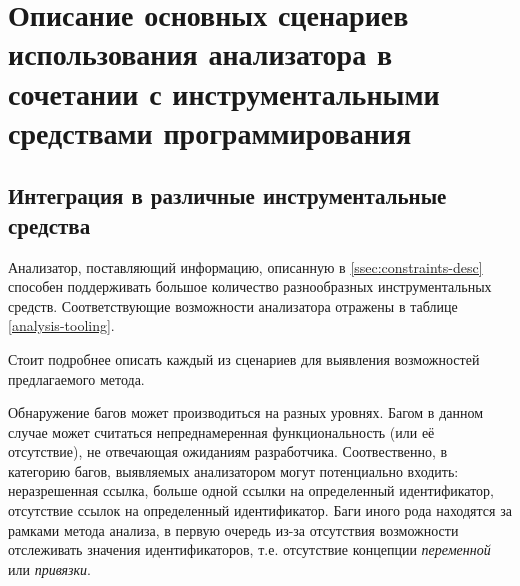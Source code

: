 \chapter{Описание основных сценариев использования анализатора в сочетании с
инструментальными средствами программирования}

\section{Интеграция в различные инструментальные средства}

Анализатор, поставляющий информацию, описанную в \ref{ssec:constraints-desc} способен
поддерживать большое количество разнообразных инструментальных средств. Соответствующие
возможности анализатора отражены в таблице \ref{analysis-tooling}.

\begin{table}[h]
    \caption{\textbf{Поддержка анализатором различных сценариев использования инструментальных средств}}
    \label{analysis-tooling}
\end{table}

Стоит подробнее описать каждый из сценариев для выявления возможностей предлагаемого метода.

Обнаружение багов может производиться на разных уровнях. Багом в данном случае может
считаться непреднамеренная функциональность (или её отсутствие), не отвечающая ожиданиям разработчика.
Соотвественно, в категорию багов, выявляемых анализатором могут потенциально входить:
неразрешенная ссылка, больше одной ссылки на определенный идентификатор, отсутствие ссылок
на определенный идентификатор. Баги иного рода находятся за рамками метода анализа, в первую
очередь из-за отсутствия возможности отслеживать значения идентификаторов, т.е.
отсутствие концепции \textit{переменной} или \textit{привязки}.

